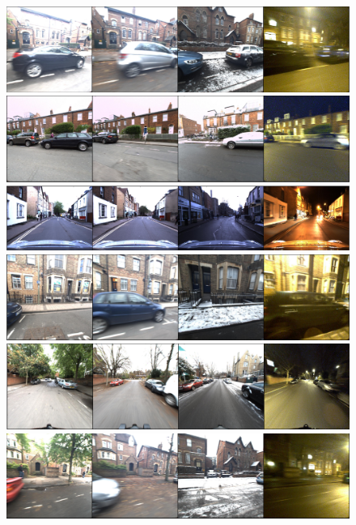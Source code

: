 \begin{figure}[t]
	\centering
	\begin{minipage}[t]{0.44\linewidth}
		\includegraphics[width=\linewidth]{details/oxf_exs/ex1}
		
		\includegraphics[width=\linewidth]{details/oxf_exs/ex2}
		
		\includegraphics[width=\linewidth]{details/oxf_exs/ex4}
		
		\includegraphics[width=\linewidth]{details/oxf_exs/ex6}
		
		\includegraphics[width=\linewidth]{details/oxf_exs/ex3}
		
		\includegraphics[width=\linewidth]{details/oxf_exs/ex5}
		

\end{minipage}
\end{figure}
